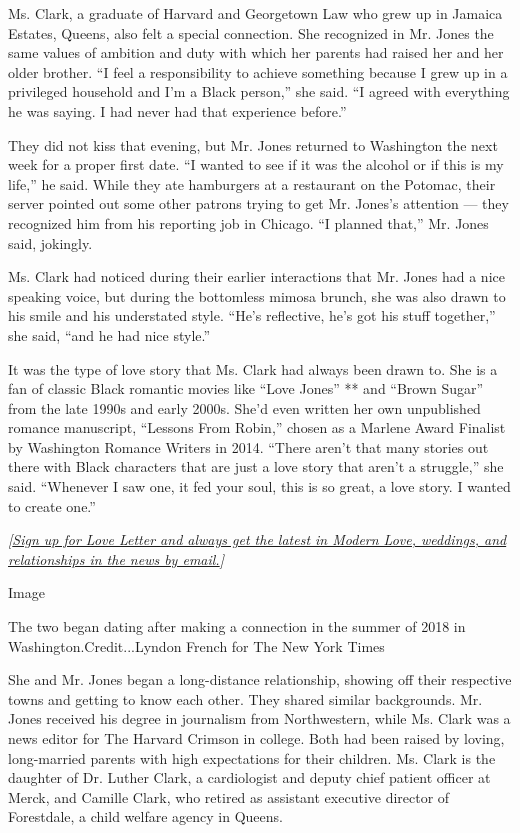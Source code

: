 Ms. Clark, a graduate of Harvard and Georgetown Law who grew up in
Jamaica Estates, Queens, also felt a special connection. She recognized
in Mr. Jones the same values of ambition and duty with which her parents
had raised her and her older brother. ``I feel a responsibility to
achieve something because I grew up in a privileged household and I'm a
Black person,'' she said. ``I agreed with everything he was saying. I
had never had that experience before.''

They did not kiss that evening, but Mr. Jones returned to Washington the
next week for a proper first date. ``I wanted to see if it was the
alcohol or if this is my life,'' he said. While they ate hamburgers at a
restaurant on the Potomac, their server pointed out some other patrons
trying to get Mr. Jones's attention --- they recognized him from his
reporting job in Chicago. ``I planned that,'' Mr. Jones said, jokingly.

Ms. Clark had noticed during their earlier interactions that Mr. Jones
had a nice speaking voice, but during the bottomless mimosa brunch, she
was also drawn to his smile and his understated style. ``He's
reflective, he's got his stuff together,'' she said, ``and he had nice
style.''

It was the type of love story that Ms. Clark had always been drawn to.
She is a fan of classic Black romantic movies like ``Love Jones'' ** and
``Brown Sugar'' from the late 1990s and early 2000s. She'd even written
her own unpublished romance manuscript, ``Lessons From Robin,'' chosen
as a Marlene Award Finalist by Washington Romance Writers in 2014.
``There aren't that many stories out there with Black characters that
are just a love story that aren't a struggle,'' she said. ``Whenever I
saw one, it fed your soul, this is so great, a love story. I wanted to
create one.''

\emph{{[}}\href{https://www.nytimes3xbfgragh.onion/newsletters/love-letter?module=inline}{\emph{Sign
up for Love Letter and always get the latest in Modern Love, weddings,
and relationships in the news by email.}}\emph{{]}}

Image

The two began dating after making a connection in the summer of 2018 in
Washington.Credit...Lyndon French for The New York Times

She and Mr. Jones began a long-distance relationship, showing off their
respective towns and getting to know each other. They shared similar
backgrounds. Mr. Jones received his degree in journalism from
Northwestern, while Ms. Clark was a news editor for The Harvard Crimson
in college. Both had been raised by loving, long-married parents with
high expectations for their children. Ms. Clark is the daughter of Dr.
Luther Clark, a cardiologist and deputy chief patient officer at Merck,
and Camille Clark, who retired as assistant executive director of
Forestdale, a child welfare agency in Queens.

